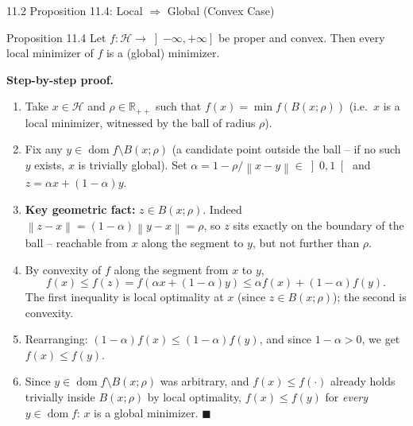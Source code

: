 \documentclass[aspectratio=169,10pt]{beamer}
\newcommand{\mHH}{\mathcal H}
\newcommand{\norm}[1]{\left\|#1\right\|}
\newcommand{\Rpp}{\mathbb{R}_{++}}
\newcommand{\dom}{\operatorname{dom}}
\begin{document}
\begin{frame}{11.2 Proposition 11.4: Local $\Rightarrow$ Global (Convex Case)}

  \begin{block}{Proposition 11.4}
    Let $f:\mHH\to\left]-\infty,+\infty\right]$ be proper and convex.
    Then every local minimizer of $f$ is a (global) minimizer.
  \end{block}

  \textbf{Step-by-step proof.}
  \begin{enumerate}
    \item Take $x\in\mHH$ and $\rho\in\Rpp$ such that
          $f(x)=\min f(B(x;\rho))$ (i.e.\ $x$ is a local minimizer,
          witnessed by the ball of radius $\rho$).
    \item Fix any $y\in\dom f\setminus B(x;\rho)$ (a candidate point
          outside the ball -- if no such $y$ exists, $x$ is trivially
          global). Set $\alpha=1-\rho/\norm{x-y}\in\left]0,1\right[$
          and $z=\alpha x+(1-\alpha)y$.
    \item \textbf{Key geometric fact:} $z\in B(x;\rho)$. Indeed
          $\norm{z-x}=(1-\alpha)\norm{y-x}=\rho$, so $z$ sits exactly
          on the boundary of the ball -- reachable from $x$ along the
          segment to $y$, but not further than $\rho$.
    \item By convexity of $f$ along the segment from $x$ to $y$,
          \[
            f(x)\le f(z)=f(\alpha x+(1-\alpha)y)\le\alpha f(x)+(1-\alpha)f(y).
          \]
          The first inequality is local optimality at $x$ (since
          $z\in B(x;\rho)$); the second is convexity.
    \item Rearranging: $(1-\alpha)f(x)\le(1-\alpha)f(y)$, and since
          $1-\alpha>0$, we get $f(x)\le f(y)$.
    \item Since $y\in\dom f\setminus B(x;\rho)$ was arbitrary, and
          $f(x)\le f(\cdot)$ already holds trivially inside
          $B(x;\rho)$ by local optimality, $f(x)\le f(y)$ for
          \emph{every} $y\in\dom f$: $x$ is a global minimizer.
          \hfill$\blacksquare$
  \end{enumerate}

\end{frame}
\end{document}
